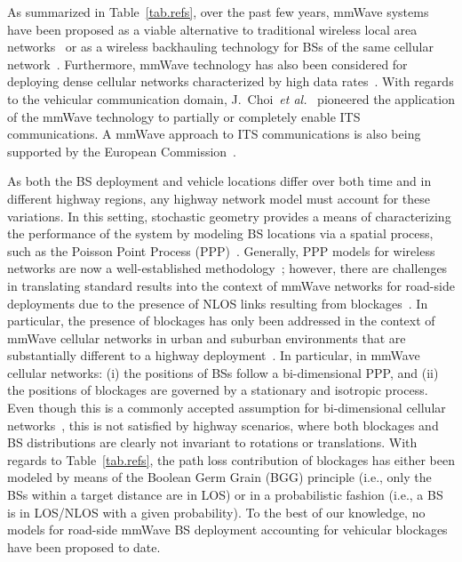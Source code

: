 \documentclass[10pt,journal,a4paper]{IEEEtran}
\begin{document}
As summarized in Table~\ref{tab.refs}, over the past few years, mmWave systems have been proposed as a viable alternative to traditional wireless local area networks~\cite{C0} or as a wireless backhauling technology for BSs of the same cellular network~\cite{C1,C2}. Furthermore, mmWave technology has also been considered for deploying dense cellular networks characterized by high data rates~\cite{6932503,7010535,7105406}. With regards to the vehicular communication domain, J.~Choi~\textit{et al.}~\cite{RR0} pioneered the application of the mmWave technology to partially or completely enable ITS communications. A mmWave approach to ITS communications is also being supported by the European Commission~\cite{C_ITS}.

As both the BS deployment and vehicle locations differ over both time and in different highway regions, any highway network model must account for these variations. In this setting, stochastic geometry provides a means of characterizing the performance of the system by modeling BS locations via a spatial process, such as the Poisson Point Process (PPP)~\cite{SGC0}.
Generally, PPP models for wireless networks are now a well-established methodology~\cite{1542405,Lee2013,SGC0,6524460,6497002,RR1}; however, there are challenges in translating standard results into the context of mmWave networks for road-side deployments due to the presence of NLOS links resulting from blockages~\cite{6932503}.
In particular, the presence of blockages has only been addressed in the context of mmWave cellular networks in urban and suburban environments that are substantially different to a highway deployment~\cite{6932503}. In particular, in mmWave cellular networks: (i) the positions of BSs follow a bi-dimensional PPP, and (ii) the positions of blockages are governed by a stationary and isotropic process. Even though this is a commonly accepted assumption for bi-dimensional cellular networks~\cite{SGC0}, this is not satisfied by highway scenarios, where both blockages and BS distributions are clearly not invariant to rotations or translations. With regards to Table~\ref{tab.refs}, the path loss contribution of blockages has either been modeled by means of the Boolean Germ Grain (BGG) principle (i.e., only the BSs within a target distance are in LOS) or in a probabilistic fashion (i.e., a BS is in LOS/NLOS with a given probability). To the best of our knowledge, no models for road-side mmWave BS deployment accounting for vehicular blockages have been proposed to date.
\end{document}
